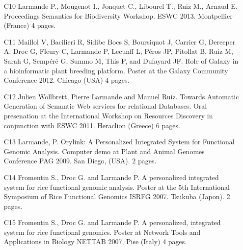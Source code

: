 \begin{itemize}
\item [C10]	Larmande P., Mougenot I., Jonquet C., Libourel T., Ruiz M., Arnaud E. Proceedings Semantics for Biodiversity Workshop. ESWC 2013. Montpellier (France) 4 pages.
\item [C11]	Maillol V, Bacilieri R, Sidibe Bocs S, Boursiquot J, Carrier G, Dereeper A, Droc G, Fleury C, Larmande P, Lecunff L, Péros JP, Pitollat B, Ruiz M, Sarah G, Sempéré G, Summo M, This P, and Dufayard JF. Role of Galaxy in a bioinformatic plant breeding platform. Poster at the Galaxy Community Conference 2012. Chicago (USA) 4 pages.
\item [C12]	Julien Wollbrett, Pierre Larmande and Manuel Ruiz. Towards Automatic Generation of Semantic Web services for relational Databases. Oral presenation at the International Workshop on Resources Discovery in conjunction with ESWC 2011. Heraclion (Greece) 6 pages.
\item [C13]	Larmande, P. Orylink: A Personalized Integrated System for Functional Genomic Analysis. Computer demo at Plant and Animal Genomes Conference PAG 2009. San Diego, (USA). 2 pages.
\item [C14]	Fromentin S., Droc G. and Larmande P. A personalized integrated system for rice functional genomic analysis. Poster at the 5th International Symposium of Rice Functional Genomics ISRFG 2007. Tsukuba (Japon). 2 pages.
\item [C15]	Fromentin S., Droc G. and Larmande P. A personalized, integrated system for rice functional genomics. Poster at Network Tools and Applications in Biology NETTAB 2007, Pise (Italy) 4 pages.
\end{itemize} 

